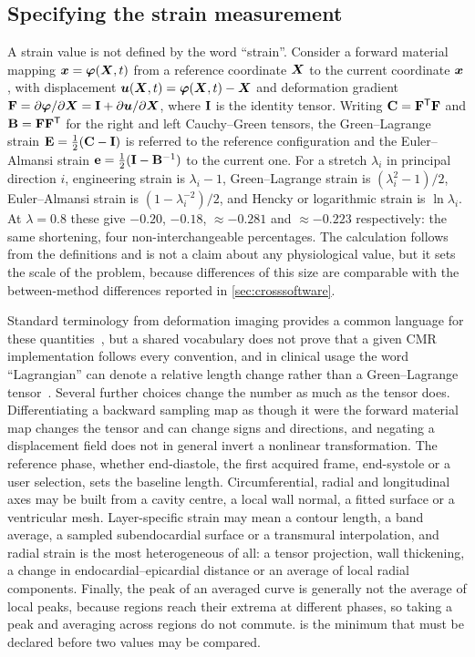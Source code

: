 \subsection{Specifying the strain measurement}\label{sec:estimand}

A strain value is not defined by the word \enquote{strain}. Consider a forward material mapping
$\bm{x}=\bm{\varphi}(\bm{X},t)$ from a reference coordinate $\bm{X}$ to the current
coordinate $\bm{x}$, with displacement $\bm{u}(\bm{X},t)=\bm{\varphi}(\bm{X},t)-\bm{X}$
and deformation gradient
$\mathbf{F}=\partial\bm{\varphi}/\partial\bm{X}=\mathbf{I}+\partial\bm{u}/\partial\bm{X}$, where
$\mathbf{I}$ is the identity tensor. Writing $\mathbf{C}=\mathbf{F}^{\mathsf{T}}\mathbf{F}$ and
$\mathbf{B}=\mathbf{F}\mathbf{F}^{\mathsf{T}}$ for the right and left Cauchy--Green tensors, the Green--Lagrange
strain $\mathbf{E}=\tfrac12(\mathbf{C}-\mathbf{I})$ is referred to the reference configuration and the
Euler--Almansi strain $\mathbf{e}=\tfrac12(\mathbf{I}-\mathbf{B}^{-1})$ to the current one. For a stretch
$\lambda_i$ in principal direction $i$, engineering strain is $\lambda_i-1$, Green--Lagrange strain
is $(\lambda_i^2-1)/2$, Euler--Almansi strain is $(1-\lambda_i^{-2})/2$, and Hencky or logarithmic
strain is $\ln\lambda_i$. At $\lambda=0.8$ these give $-0.20$, $-0.18$, $\approx-0.281$ and
$\approx-0.223$ respectively: the same shortening, four non-interchangeable percentages. The
calculation follows from the definitions and is not a claim about any physiological value, but it
sets the scale of the problem, because differences of this size are comparable with the between-method
differences reported in \cref{sec:crosssoftware}.

Standard terminology from deformation imaging provides a common language for these
quantities~\citep{voigt2015,amzulescu2019,smiseth2025}, but a shared vocabulary does not prove that
a given CMR implementation follows every convention, and in clinical usage the word
\enquote{Lagrangian} can denote a relative length change rather than a Green--Lagrange
tensor~\citep{voigt2015}. Several further choices change the number as much as the tensor does. Differentiating a backward
sampling map as though it were the forward material map changes the tensor and can change signs and
directions, and negating a displacement field does not in general invert a nonlinear transformation.
The reference phase, whether end-diastole, the first acquired frame, end-systole or a user selection,
sets the baseline length. Circumferential, radial and longitudinal axes may be built from a cavity
centre, a local wall normal, a fitted surface or a ventricular mesh. Layer-specific strain may mean
a contour length, a band average, a sampled subendocardial surface or a transmural interpolation,
and radial strain is the most heterogeneous of all: a tensor projection, wall thickening, a change
in endocardial--epicardial distance or an average of local radial components. Finally, the peak of
an averaged curve is generally not the average of local peaks, because regions reach their extrema
at different phases, so taking a peak and averaging across regions do not commute.
 is the minimum that must be declared before two values may be compared.

